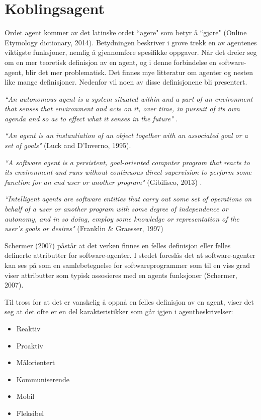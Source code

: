 \section{Koblingsagent}
Ordet agent kommer av det latinske ordet ``agere" som betyr å ``gjøre" (Online Etymology dictionary, 2014)\cite{website:agent}. Betydningen beskriver i grove trekk en av agentenes viktigste funksjoner, nemlig å gjennomføre spesifikke oppgaver. Når det dreier seg om en mer teoretisk definisjon av en agent, og i denne forbindelse en software-agent, blir det mer problematisk. Det finnes mye litteratur om agenter og nesten like mange definisjoner. Nedenfor vil noen av disse definisjonene bli presentert.

\textit{``An autonomous agent is a system situated within and a part of an environment
that senses that environment and acts on it, over time, in pursuit of its own agenda
and so as to effect what it senses in the future"} \cite{agent}.

\textit{``An agent is an instantiation of an object together with an associated goal or a set of goals"} (Luck and D'Inverno, 1995)\cite{luck_dinverno_agent}.

\textit{``A software agent is a persistent, goal-oriented computer program that reacts to its environment and runs without continuous direct supervision to perform some function for an end user or another program"} (Gibilisco, 2013) \cite{website:gibilesco_agent}.

\textit{``Intelligent agents are software entities that carry out some set of operations on behalf of a user or another program with some degree of independence or autonomy, and in so doing,
employ some knowledge or representation of the user's goals or desires"} (Franklin \& Graesser, 1997)\cite{agent}

Schermer (2007)\cite{schermer} påstår at det verken finnes en felles definisjon eller felles definerte attributter for software-agenter. I stedet foreslås det at software-agenter kan ses på som en samlebetegnelse for softwareprogrammer som til en viss grad viser attributter som typisk assosieres med en agents funksjoner (Schermer, 2007)\cite{schermer}.

Til tross for at det er vanskelig å oppnå en felles definisjon av en agent, viser det seg at det ofte er en del karakteristikker som går igjen i agentbeskrivelser:
\begin{itemize}
\item Reaktiv
\item Proaktiv
\item Målorientert
\item Kommuniserende
\item Mobil
\item Fleksibel
\end{itemize}

